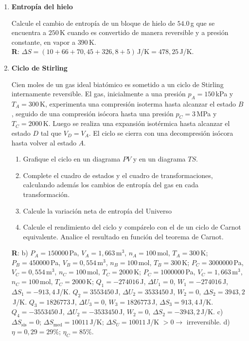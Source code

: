 \documentclass[a4paper,12pt]{article}
\begin{document}
\begin{enumerate}
	\item {\bf{Entropía del hielo}}

		Calcule el cambio de entropía de un bloque de hielo de $54.0$\,g que se
		encuentra a $250$\,K cuando es convertido de manera reversible y a
		presión constante, en vapor a $390$\,K.
        \\{\bf{R}}: $\Delta S=(10+66+70,45+326,8+5)$\,J/K$=478,25$\,J/K.
	

	\item {\bf{Ciclo de Stirling}}

		Cien moles de un gas ideal biatómico es sometido a un ciclo de Stirling
		internamente reversible. El gas, inicialmente a una presión
		$p_A=150$\,kPa y $T_A=300$\,K, experimenta una compresión isoterma
		hasta alcanzar el estado $B$, seguido de una compresión isócora hasta
		una presión $p_C=3$\,MPa y $T_C=2000$\,K. Luego se realiza una
		expansión isotérmica hasta alcanzar el estado $D$ tal que $V_D=V_A$. El
		ciclo se cierra con una decompresión isócora hasta volver al estado
		$A$.
		\begin{enumerate}
			\item Grafique el ciclo en un diagrama $PV$ y en un diagrama $TS$.
			\item Complete el cuadro de estados y el cuadro de
				transformaciones, calculando además los cambios de entropía del
				gas en cada transformación.
			\item Calcule la variación neta de entropía del Universo
			\item Calcule el rendimiento del ciclo y compárelo con el de un
				ciclo de Carnot equivalente. Analice el resultado en función
				del teorema de Carnot.
		\end{enumerate}
        {\bf{R}}: b) 
		$P_A=150000$\,Pa, $V_A=1,663$\,m$^3$, $n_A=100$\,mol, $T_A=300$\,K; 
		$P_B=450000$\,Pa, $V_B=0,554$\,m$^3$, $n_B=100$\,mol, $T_B=300$\,K; 
		$P_C=3000000$\,Pa, $V_C=0,554$\,m$^3$, $n_C=100$\,mol, $T_C=2000$\,K; 
		$P_C=1000000$\,Pa, $V_C=1,663$\,m$^3$, $n_C=100$\,mol, $T_C=2000$\,K; 
		$Q_1=-274016$\,J, $\Delta U_1=0$, $W_1=-274016$\,J, $\Delta S_1=-913,4$\,J/K.
		$Q_2=3553450$\,J, $\Delta U_2=3533450$\,J, $W_2=0$, $\Delta S_2=3943,2$\,J/K.
		$Q_3=1826773$\,J, $\Delta U_3=0$, $W_3=1826773$\,J, $\Delta S_3=913,4$\,J/K.
		$Q_4=-3553450$\,J, $\Delta U_2=-3533450$\,J, $W_2=0$, $\Delta S_2=-3943,2$\,J/K.
		c) $\Delta S_{\mathrm{sis}} = 0$; $\Delta S_{\mathrm{med}}=10011$\,J/K;
		$\Delta S_U=10011$\,J/K $>0 \to$ irreversible. 
		d) $\eta= 0,29 = 29\%$; $\eta_C=85\%$.


\end{enumerate}
\end{document}
